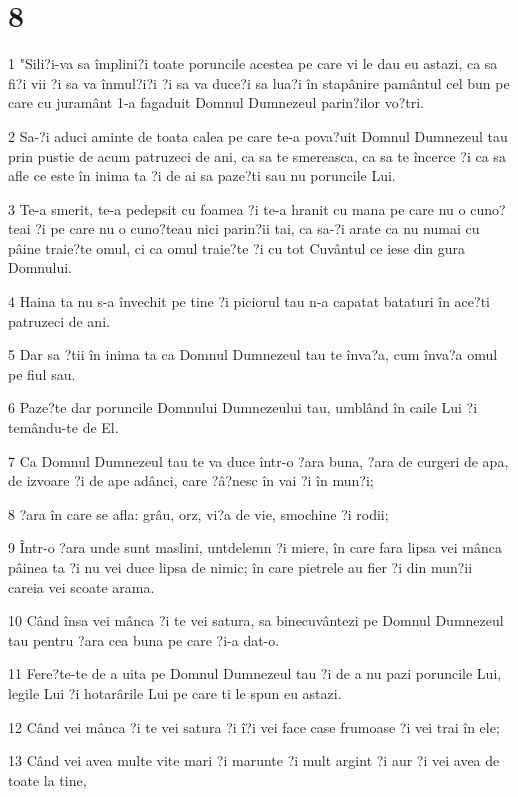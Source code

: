\chapter{8}

\par 1 "Sili?i-va sa împlini?i toate poruncile acestea pe care vi le dau eu astazi, ca sa fi?i vii ?i sa va înmul?i?i ?i sa va duce?i sa lua?i în stapânire pamântul cel bun pe care cu juramânt 1-a fagaduit Domnul Dumnezeul parin?ilor vo?tri.
\par 2 Sa-?i aduci aminte de toata calea pe care te-a pova?uit Domnul Dumnezeul tau prin pustie de acum patruzeci de ani, ca sa te smereasca, ca sa te încerce ?i ca sa afle ce este în inima ta ?i de ai sa paze?ti sau nu poruncile Lui.
\par 3 Te-a smerit, te-a pedepsit cu foamea ?i te-a hranit cu mana pe care nu o cuno?teai ?i pe care nu o cuno?teau nici parin?ii tai, ca sa-?i arate ca nu numai cu pâine traie?te omul, ci ca omul traie?te ?i cu tot Cuvântul ce iese din gura Domnului.
\par 4 Haina ta nu s-a învechit pe tine ?i piciorul tau n-a capatat bataturi în ace?ti patruzeci de ani.
\par 5 Dar sa ?tii în inima ta ca Domnul Dumnezeul tau te înva?a, cum înva?a omul pe fiul sau.
\par 6 Paze?te dar poruncile Domnului Dumnezeului tau, umblând în caile Lui ?i temându-te de El.
\par 7 Ca Domnul Dumnezeul tau te va duce într-o ?ara buna, ?ara de curgeri de apa, de izvoare ?i de ape adânci, care ?â?nesc în vai ?i în mun?i;
\par 8 ?ara în care se afla: grâu, orz, vi?a de vie, smochine ?i rodii;
\par 9 Într-o ?ara unde sunt maslini, untdelemn ?i miere, în care fara lipsa vei mânca pâinea ta ?i nu vei duce lipsa de nimic; în care pietrele au fier ?i din mun?ii careia vei scoate arama.
\par 10 Când însa vei mânca ?i te vei satura, sa binecuvântezi pe Domnul Dumnezeul tau pentru ?ara cea buna pe care ?i-a dat-o.
\par 11 Fere?te-te de a uita pe Domnul Dumnezeul tau ?i de a nu pazi poruncile Lui, legile Lui ?i hotarârile Lui pe care ti le spun eu astazi.
\par 12 Când vei mânca ?i te vei satura ?i î?i vei face case frumoase ?i vei trai în ele;
\par 13 Când vei avea multe vite mari ?i marunte ?i mult argint ?i aur ?i vei avea de toate la tine,
